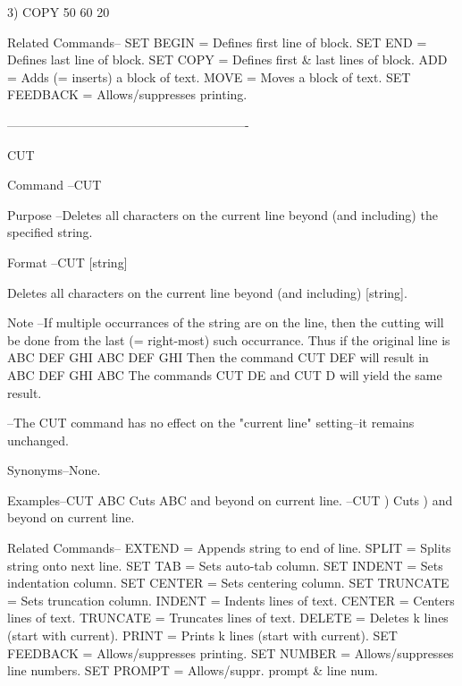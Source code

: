           3) COPY 50 60 20
 
Related Commands--
          SET BEGIN       = Defines first line of block.
          SET END         = Defines last line of block.
          SET COPY        = Defines first & last lines of block.
          ADD             = Adds (= inserts) a block of text.
          MOVE            = Moves a block of text.
          SET FEEDBACK    = Allows/suppresses printing.
 
----------------------------------------------------------
 
CUT
 
Command --CUT
 
Purpose --Deletes all characters on the current
          line beyond (and including) the
          specified string.
 
Format  --CUT   [string]
 
          Deletes all characters on the current
          line beyond (and including) [string].
 
Note    --If multiple occurrances of the string
          are on the line, then the cutting will
          be done from the last (= right-most) such
          occurrance.  Thus if the original line is
             ABC DEF GHI ABC DEF GHI
          Then the command
             CUT DEF
          will result in
             ABC DEF GHI ABC
          The commands
             CUT DE
          and
             CUT D
          will yield the same result.
 
        --The CUT command has no effect
          on the "current line" setting--it
          remains unchanged.
 
Synonyms--None.
 
Examples--CUT ABC          Cuts ABC and beyond on current line.
        --CUT )            Cuts ) and beyond on current line.
 
Related Commands--
          EXTEND          = Appends string to end of line.
          SPLIT           = Splits string onto next line.
          SET TAB         = Sets auto-tab column.
          SET INDENT      = Sets indentation column.
          SET CENTER      = Sets centering column.
          SET TRUNCATE    = Sets truncation column.
          INDENT          = Indents lines of text.
          CENTER          = Centers lines of text.
          TRUNCATE        = Truncates lines of text.
          DELETE          = Deletes k lines (start with current).
          PRINT           = Prints k lines (start with current).
          SET FEEDBACK    = Allows/suppresses printing.
          SET NUMBER      = Allows/suppresses line numbers.
          SET PROMPT      = Allows/suppr. prompt & line num.
 
